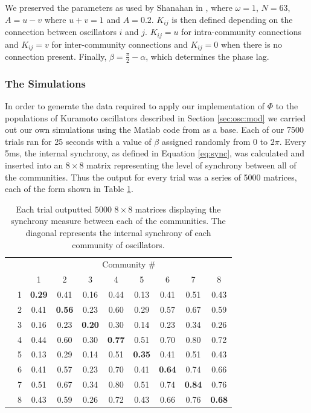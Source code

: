 \documentclass[a4paper,11pt]{article}
\begin{document}
We preserved the parameters as used by Shanahan in \cite{Shanahan2010}, where $\omega = 1$, $N = 63$, $A = u - v$ where $u + v = 1$ and $A = 0.2$. $K_{ij}$ is then defined depending on the connection between oscillators $i$ and $j$. $K_{ij} = u$ for intra-community connections and $K_{ij} = v$ for inter-community connections and $K_{ij} = 0$ when there is no connection present. Finally, $\beta = \frac{\pi}{2} - \alpha$, which determines the phase lag.

\subsubsection{The Simulations}
\label{sec:osc:sims}

In order to generate the data required to apply our implementation of $\Phi$ to the populations of Kuramoto oscillators described in Section \ref{sec:osc:mod} we carried out our own simulations using the Matlab code from \cite{Shanahan2010} as a base. Each of our 7500 trials ran for 25 seconds with a value of $\beta$ assigned randomly from $0$ to $2\pi$. Every 5ms, the internal synchrony, as defined in Equation \ref{eq:sync}, was calculated and inserted into an $8 \times 8$ matrix representing the level of synchrony between all of the communities. Thus the output for every trial was a series of 5000 matrices, each of the form shown in Table \ref{tab:mat}.


\begin{table}[H]
\centering

\begin{tabular}{c l | c c c c c c c c}

& & \multicolumn{8}{c}{Community \#} \\ [2mm]
& & 1 & 2 & 3 & 4 & 5 & 6 & 7 & 8 \\
\hline
\parbox[t]{2mm}{}
& 1 & \textbf{0.29} & 0.41 & 0.16 & 0.44 & 0.13 & 0.41 & 0.51 & 0.43 \\
& 2 & 0.41 & \textbf{0.56} & 0.23 & 0.60 & 0.29 & 0.57 & 0.67 & 0.59 \\
& 3 & 0.16 & 0.23 & \textbf{0.20} & 0.30 & 0.14 & 0.23 & 0.34 & 0.26 \\
& 4 & 0.44 & 0.60 & 0.30 & \textbf{0.77} & 0.51 & 0.70 & 0.80 & 0.72 \\
& 5 & 0.13 & 0.29 & 0.14 & 0.51 & \textbf{0.35} & 0.41 & 0.51 & 0.43 \\
& 6 & 0.41 & 0.57 & 0.23 & 0.70 & 0.41 & \textbf{0.64} & 0.74 & 0.66 \\
& 7 & 0.51 & 0.67 & 0.34 & 0.80 & 0.51 & 0.74 & \textbf{0.84} & 0.76 \\
& 8 & 0.43 & 0.59 & 0.26 & 0.72 & 0.43 & 0.66 & 0.76 & \textbf{0.68} \\
\end{tabular}
\caption{Each trial outputted $5000$ $8 \times 8$ matrices displaying the synchrony measure between each of the communities. The diagonal represents the internal synchrony of each community of oscillators. \label{tab:mat}}
\end{table}
\end{document}
